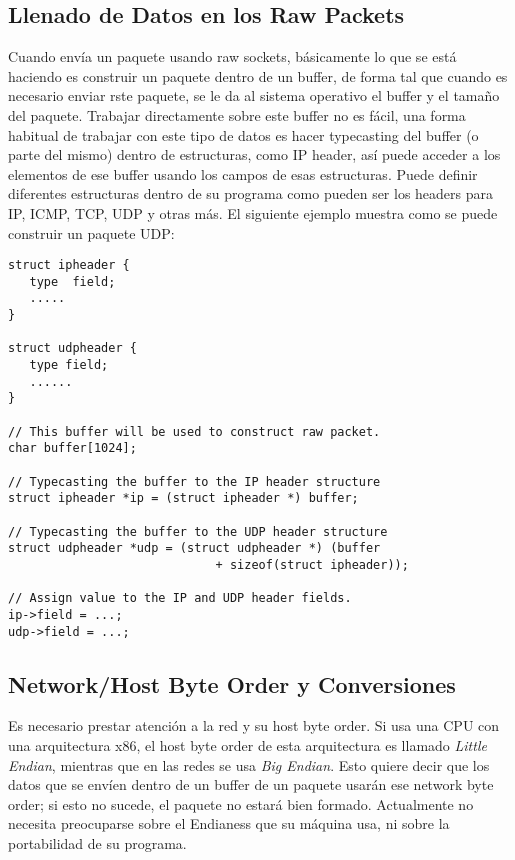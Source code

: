\subsection{Llenado de Datos en los Raw Packets}

Cuando envía un paquete usando raw sockets, básicamente lo que se está haciendo es construir un paquete dentro de un buffer, de forma tal que cuando es necesario enviar rste paquete, se le da al sistema operativo el buffer y el tamaño del paquete. 
Trabajar directamente sobre este buffer no es fácil, una forma habitual de trabajar con este tipo de datos es hacer typecasting del buffer (o parte del mismo) dentro de estructuras, como IP header, así puede acceder a los elementos de ese buffer usando los campos de esas estructuras.
Puede definir diferentes estructuras dentro de su programa como pueden ser los headers para IP, ICMP, TCP, UDP y otras más. El siguiente ejemplo muestra como se puede construir un paquete UDP:

\begin{lstlisting}
struct ipheader {
   type  field;
   .....
}

struct udpheader {
   type field;
   ......
}

// This buffer will be used to construct raw packet.
char buffer[1024];

// Typecasting the buffer to the IP header structure
struct ipheader *ip = (struct ipheader *) buffer;

// Typecasting the buffer to the UDP header structure
struct udpheader *udp = (struct udpheader *) (buffer
                             + sizeof(struct ipheader));

// Assign value to the IP and UDP header fields.
ip->field = ...;
udp->field = ...;
\end{lstlisting}



\subsection{Network/Host Byte Order y Conversiones}

Es necesario prestar atención a la red y su host byte order. Si usa una CPU con una arquitectura x86, el host byte order de esta arquitectura es llamado {\em Little Endian}, mientras que en las redes se usa {\em Big Endian}. Esto quiere decir que los datos que se envíen dentro de un buffer de un paquete usarán ese network byte order; si esto no sucede, el paquete no estará bien formado. Actualmente no necesita preocuparse sobre el Endianess que su máquina usa, ni sobre la portabilidad de su programa.

